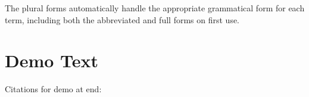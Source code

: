 The plural forms automatically handle the appropriate grammatical form for each term, including both the abbreviated and full forms on first use.

\section{Demo Text}
Citations for demo at end: \autocite{yourname2024spie1,yourname2023spie2,yourname2022spie4}
